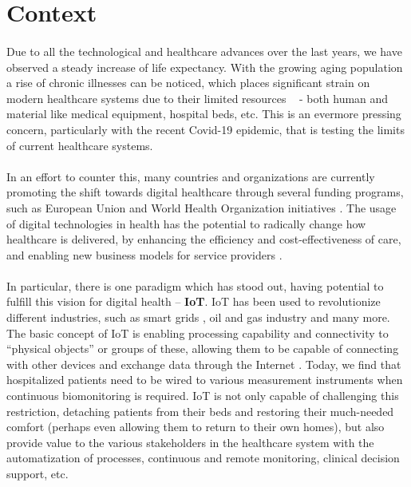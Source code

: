

\section{Context}

\paragraph{} Due to all the technological and healthcare advances over the last years, we have observed a steady increase of life expectancy. With the growing aging population a rise of chronic illnesses can be noticed, which places significant strain on modern healthcare systems due to their limited resources ~\cite{Koen2019, Redondi2013} - both human and material like medical equipment, hospital beds, etc. This is an evermore pressing concern, particularly with the recent Covid-19 epidemic, that is testing the limits of current healthcare systems. 

\paragraph{} In an effort to counter this, many countries and organizations are currently promoting the shift towards digital healthcare through several funding programs, such as European Union \cite{EuropeanUnion2021} and World Health Organization initiatives \cite{WorldHealthOrganization2020}. The usage of digital technologies in health has the potential to radically change how healthcare is delivered, by enhancing the efficiency and cost-effectiveness of care, and enabling new business models for service providers \cite{WorldHealthOrganization2020}.

\paragraph{} In particular, there is one paradigm which has stood out, having potential to fulfill this vision for digital health -- \textbf{\acf{IoT}}. \acs{IoT} has been used to revolutionize different industries, such as smart grids \cite{Faria2020}, oil and gas industry \cite{Shoja2018} and many more. The basic concept of \acs{IoT} is enabling processing capability and connectivity to ``physical objects'' or groups of these, allowing them to be capable of connecting with other devices and exchange data through the Internet \cite{gershenfeld2004internet}. Today, we find that hospitalized patients need to be wired to various measurement instruments when continuous biomonitoring is required. \acs{IoT} is not only capable of challenging this restriction, detaching patients from their beds and restoring their much-needed comfort (perhaps even allowing them to return to their own homes), but also provide value to the various stakeholders in the healthcare system with the automatization of processes, continuous and remote monitoring, clinical decision support, etc.

